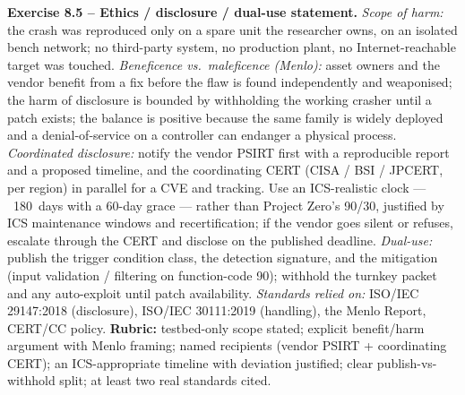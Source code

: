 \documentclass[11pt,a4paper]{article}
\begin{document}
\begin{solutionbox}
\textbf{Exercise 8.5 -- Ethics / disclosure / dual-use statement.}
\textit{Scope of harm:} the crash was reproduced only on a spare unit the
researcher owns, on an isolated bench network; no third-party system, no
production plant, no Internet-reachable target was touched. \textit{Beneficence vs.\
maleficence (Menlo):} asset owners and the vendor benefit from a fix before the
flaw is found independently and weaponised; the harm of disclosure is bounded by
withholding the working crasher until a patch exists; the balance is positive
because the same family is widely deployed and a denial-of-service on a controller
can endanger a physical process. \textit{Coordinated disclosure:} notify the vendor
PSIRT first with a reproducible report and a proposed timeline, and the
coordinating CERT (CISA / BSI / JPCERT, per region) in parallel for a CVE and
tracking. Use an ICS-realistic clock --- ~180~days with a 60-day grace --- rather
than Project Zero's 90/30, justified by ICS maintenance windows and
recertification; if the vendor goes silent or refuses, escalate through the CERT
and disclose on the published deadline. \textit{Dual-use:} publish the trigger
condition class, the detection signature, and the mitigation (input validation /
filtering on function-code 90); withhold the turnkey packet and any auto-exploit
until patch availability. \textit{Standards relied on:} ISO/IEC 29147:2018
(disclosure), ISO/IEC 30111:2019 (handling), the Menlo Report, CERT/CC policy.
\textbf{Rubric:} testbed-only scope stated; explicit benefit/harm argument with
Menlo framing; named recipients (vendor PSIRT + coordinating CERT); an
ICS-appropriate timeline with deviation justified; clear publish-vs-withhold split;
at least two real standards cited.
\end{solutionbox}
\end{document}
